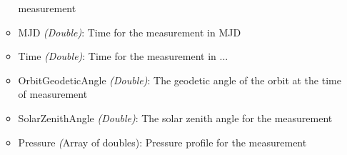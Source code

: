 \begin{itemize}
\begin{itemize}
                measurement
            \item MJD \emph{(Double)}: Time for the measurement in MJD
            \item Time \emph{(Double)}: Time for the measurement in ...
            \item OrbitGeodeticAngle \emph{(Double)}: The geodetic angle of the
                orbit at the time of measurement
            \item SolarZenithAngle \emph{(Double)}: The solar zenith angle for
                the measurement
            \item Pressure \emph({Array of doubles}): Pressure profile for the
                measurement
        \end{itemize}
\end{itemize}

